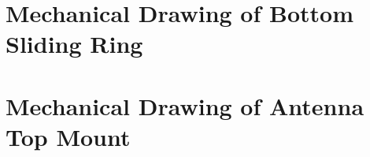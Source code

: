 \section{Mechanical Drawing of Bottom Sliding Ring} \label{appendix_mechanical_drawing_bottom_sliding_ring}
\enlargethispage{2.5cm}
\begin{adjustwidth}{0.23cm}{0cm} \hfuzz=7.0pt \vfuzz=20.0pt
\end{adjustwidth}
\newpage

\section{Mechanical Drawing of Antenna Top Mount} \label{appendix_mechanical_drawing_antenna_top_mount}
\enlargethispage{2.5cm}
\begin{adjustwidth}{-0.23cm}{0cm} \hfuzz=7.0pt \vfuzz=20.0pt
\end{adjustwidth}
\newpage

